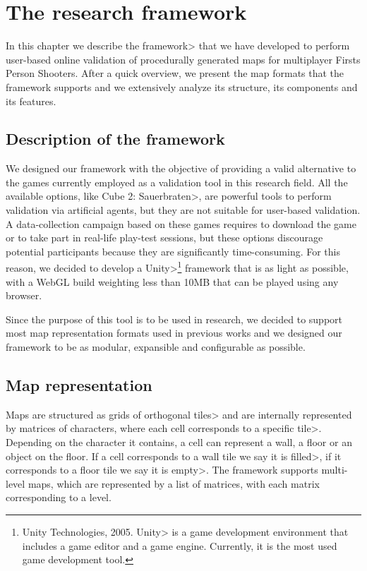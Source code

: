 \chapter{The research framework}


In this chapter we describe the \<framework> that we have developed to perform user-based online validation of procedurally generated maps for multiplayer Firsts Person Shooters. After a quick overview, we present the map formats that the framework supports and we extensively analyze its structure, its components and its features.


\section{Description of the framework}

We designed our framework with the objective of providing a valid alternative to the games currently employed as a validation tool in this research field. All the available options, like \<Cube 2: Sauerbraten>, are powerful tools to perform validation via artificial agents, but they are not suitable for user-based validation. A data-collection campaign based on these games requires to download the game or to take part in real-life play-test sessions, but these options discourage potential participants because they are significantly time-consuming. For this reason, we decided to develop a \<Unity>\footnote{Unity Technologies, 2005. \<Unity> is a game development environment that includes a game editor and a game engine. Currently, it is the most used game development tool.} framework that is as light as possible, with a WebGL build weighting less than 10MB that can be played using any browser.

\par

Since the purpose of this tool is to be used in research, we decided to support most map representation formats used in previous works and we designed our framework to be as modular, expansible and configurable as possible.


\section{Map representation}

Maps are structured as grids of orthogonal \<tiles> and are internally represented  by matrices of characters, where each cell corresponds to a specific \<tile>. Depending on the character it contains, a cell can represent a wall, a floor or an object on the floor. If a cell corresponds to a wall tile we say it is \<filled>, if it corresponds to a floor tile we say it is \<empty>. The framework supports multi-level maps, which are represented by a list of matrices, with each matrix corresponding to a level.

